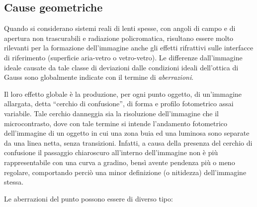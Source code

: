 \subsection {Cause geometriche}

Quando si considerano sistemi reali di lenti spesse, con angoli di campo e di apertura non trascurabili e radiazione policromatica, risultano essere molto rilevanti per la formazione dell'immagine anche gli effetti rifrattivi sulle interfacce di riferimento (superficie aria-vetro o vetro-vetro).
Le differenze dall'immagine ideale causate da tale classe di deviazioni dalle condizioni ideali dell'ottica di Gauss sono globalmente indicate con il termine di \textit{aberrazioni}.

Il loro effetto globale è la produzione, per ogni punto oggetto, di un'immagine allargata, detta ``cerchio di confusione'', di forma e profilo fotometrico assai variabile. 
Tale cerchio danneggia sia la risoluzione dell'immagine che il microcontrasto, dove con tale termine si intende l'andamento fotometrico dell'immagine di un oggetto in cui una zona buia ed una luminosa sono separate da una linea netta, senza transizioni. 
Infatti, a causa della presenza del cerchio di confusione il passaggio chiaroscuro all'interno dell'immagine non è più rappresentabile con una curva a gradino, bensì avente pendenza più o meno regolare, comportando perciò una minor definizione (o nitidezza) dell'immagine stessa.

Le aberrazioni del punto possono essere di diverso tipo:

